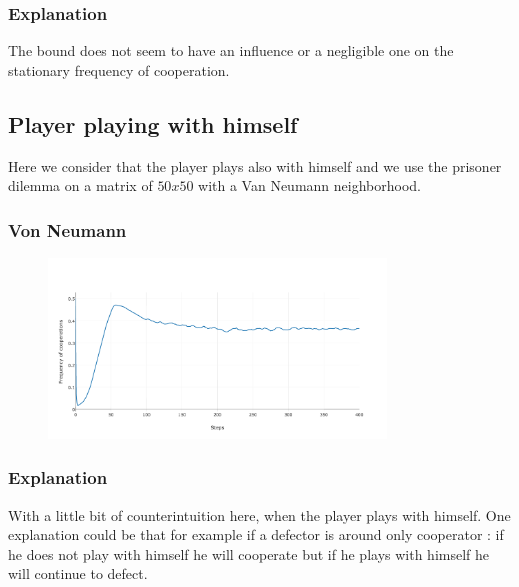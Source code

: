 \documentclass[11pt]{article}
\begin{document}
\subsubsection{Explanation}

The bound does not seem to have an influence or a negligible one on the stationary frequency of cooperation.

\subsection{Player playing with himself}

Here we consider that the player plays also with himself and we use the prisoner dilemma on a matrix of $50x50$ with a Van Neumann neighborhood.


\subsubsection{Von Neumann}

\begin{figure}[H]
\centering
   \includegraphics[width=0.8\textwidth]{img/part1/cf-vonn-myselfincluded.png}
\end{figure}

\subsubsection{Explanation}

With a little bit of counterintuition here, when the player plays with himself. One explanation could be that for example if a defector is around only cooperator : if he does not play with himself he will cooperate but if he plays with himself he will continue to defect.
\end{document}
